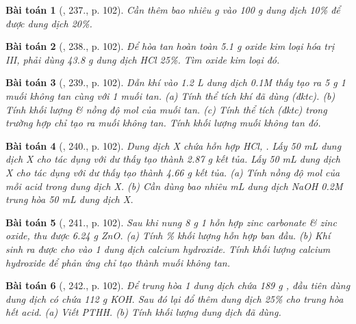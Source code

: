 \documentclass{article}
\newtheorem{baitoan}{Bài toán}
\begin{document}
\begin{baitoan}[\cite{Nguyen_Buu_Can_500_BT_Hoa_Hoc_THCS}, 237., p. 102]
	Cần thêm bao nhiêu {\rm g } vào {\rm100 g} dung dịch {\rm{} 10\%} để được dung dịch {\rm{} 20\%}.
\end{baitoan}

\begin{baitoan}[\cite{Nguyen_Buu_Can_500_BT_Hoa_Hoc_THCS}, 238., p. 102]
	Để hòa tan hoàn toàn {\rm5.1 g} oxide kim loại hóa trị {\rm III}, phải dùng {\rm43.8 g} dung dịch {\rm HCl 25\%}. Tìm oxide kim loại đó.
\end{baitoan}

\begin{baitoan}[\cite{Nguyen_Buu_Can_500_BT_Hoa_Hoc_THCS}, 239., p. 102]
	Dẫn khí {\rm{}} vào {\rm1.2 L} dung dịch {\rm{} 0.1M} thấy tạo ra {\rm5 g} 1 muối không tan cùng với 1 muối tan. (a) Tính thể tích khí {\rm{}} đã dùng (đktc). (b) Tính khối lượng \& nồng độ mol của muối tan. (c) Tính thể tích {\rm{}} (đktc) trong trường hợp chỉ tạo ra muối không tan. Tính khối lượng muối không tan đó.
\end{baitoan}

\begin{baitoan}[\cite{Nguyen_Buu_Can_500_BT_Hoa_Hoc_THCS}, 240., p. 102]
	Dung dịch X chứa hỗn hợp {\rm HCl, }. Lấy {\rm50 mL} dung dịch X cho tác dụng với {\rm{}} dư thấy tạo thành {\rm2.87 g} kết tủa. Lấy {\rm50 mL} dung dịch X cho tác dụng với {\rm{}} dư thấy tạo thành {\rm4.66 g} kết tủa. (a) Tính nồng độ mol của mỗi acid trong dung dịch X. (b) Cần dùng bao nhiêu {\rm mL} dung dịch {\rm NaOH 0.2M} trung hòa {\rm50 mL} dung dịch X.
\end{baitoan}

\begin{baitoan}[\cite{Nguyen_Buu_Can_500_BT_Hoa_Hoc_THCS}, 241., p. 102]
	Sau khi nung {\rm8 g} 1 hỗn hợp zinc carbonate \& zinc oxide, thu được {\rm6.24 g ZnO}. (a) Tính \% khối lượng hỗn hợp ban đầu. (b) Khí sinh ra được cho vào 1 dung dịch calcium hydroxide. Tính khối lượng calcium hydroxide để phản ứng chỉ tạo thành muối không tan.
\end{baitoan}

\begin{baitoan}[\cite{Nguyen_Buu_Can_500_BT_Hoa_Hoc_THCS}, 242., p. 102]
	Để trung hòa 1 dung dịch chứa {\rm189 g }, đầu tiên dùng dung dịch có chứa {\rm112 g KOH}. Sau đó lại đổ thêm dung dịch {\rm{} 25\%} cho trung hòa hết acid. (a) Viết {\rm PTHH}. (b) Tính khối lượng dung dịch {\rm{}} đã dùng.
\end{baitoan}
\end{document}
